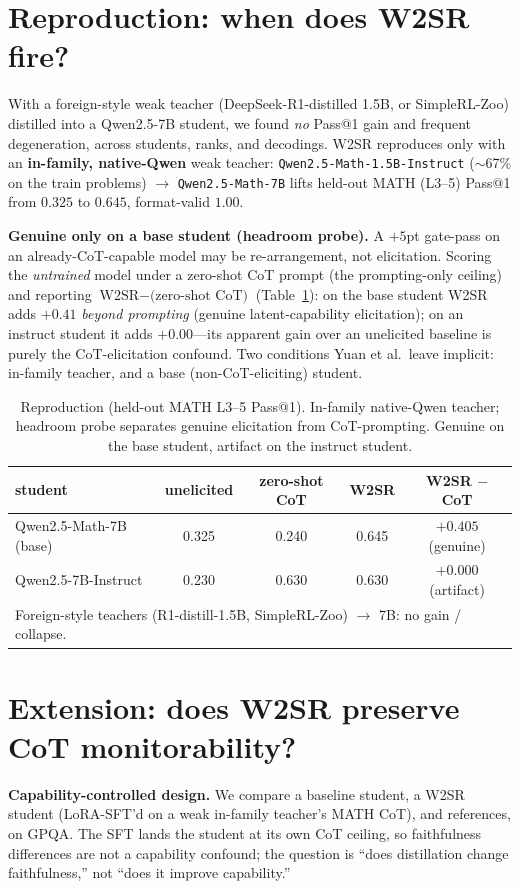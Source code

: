 \documentclass[10pt]{article}
\begin{document}
\section{Reproduction: when does W2SR fire?}
\label{sec:repro}
With a foreign-style weak teacher (DeepSeek-R1-distilled 1.5B, or SimpleRL-Zoo)
distilled into a Qwen2.5-7B student, we found \emph{no} Pass@1 gain and frequent
degeneration, across students, ranks, and decodings. W2SR reproduces only with an
\textbf{in-family, native-Qwen} weak teacher: \texttt{Qwen2.5-Math-1.5B-Instruct}
($\sim$67\% on the train problems) $\to$ \texttt{Qwen2.5-Math-7B} lifts held-out
MATH (L3--5) Pass@1 from $0.325$ to $0.645$, format-valid $1.00$.

\textbf{Genuine only on a base student (headroom probe).} A $+5$pt gate-pass on an
already-CoT-capable model may be re-arrangement, not elicitation. Scoring the
\emph{untrained} model under a zero-shot CoT prompt (the prompting-only ceiling)
and reporting $\text{W2SR}-\text{(zero-shot CoT)}$ (Table~\ref{tab:repro}): on the
base student W2SR adds $+0.41$ \emph{beyond prompting} (genuine latent-capability
elicitation); on an instruct student it adds $+0.00$---its apparent gain over an
unelicited baseline is purely the CoT-elicitation confound. Two conditions Yuan et
al.\ leave implicit: in-family teacher, and a base (non-CoT-eliciting) student.

\begin{table}[t]\centering\small
\caption{Reproduction (held-out MATH L3--5 Pass@1). In-family native-Qwen teacher;
headroom probe separates genuine elicitation from CoT-prompting. Genuine on the
base student, artifact on the instruct student.}
\label{tab:repro}
\begin{tabular}{lcccc}
\toprule
student & unelicited & zero-shot CoT & W2SR & W2SR $-$ CoT \\
\midrule
Qwen2.5-Math-7B (base) & 0.325 & 0.240 & 0.645 & $\mathbf{+0.405}$ (genuine)\\
Qwen2.5-7B-Instruct & 0.230 & 0.630 & 0.630 & $\mathbf{+0.000}$ (artifact)\\
\midrule
\multicolumn{5}{l}{\footnotesize Foreign-style teachers (R1-distill-1.5B, SimpleRL-Zoo) $\to$ 7B: no gain / collapse.}\\
\bottomrule
\end{tabular}
\end{table}

\section{Extension: does W2SR preserve CoT monitorability?}
\label{sec:ext}
\textbf{Capability-controlled design.} We compare a baseline student, a W2SR student
(LoRA-SFT'd on a weak in-family teacher's MATH CoT), and references, on GPQA. The
SFT lands the student at its own CoT ceiling, so faithfulness differences are not a
capability confound; the question is ``does distillation change faithfulness,'' not
``does it improve capability.''
\end{document}
